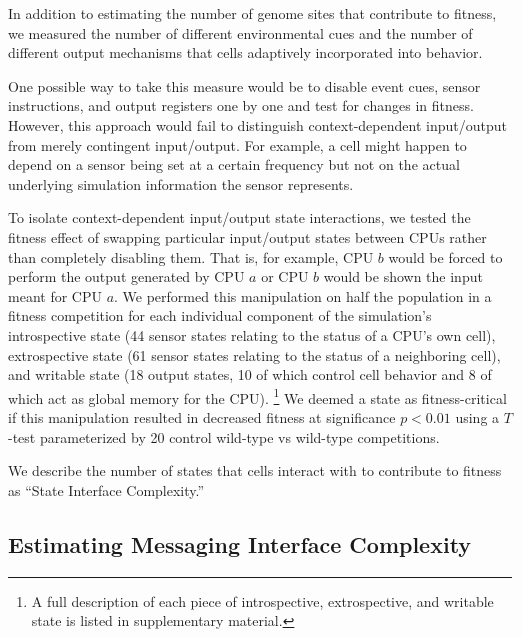 In addition to estimating the number of genome sites that contribute to fitness, we measured the number of different environmental cues and the number of different output mechanisms that cells adaptively incorporated into behavior.

One possible way to take this measure would be to disable event cues, sensor instructions, and output registers one by one and test for changes in fitness.
However, this approach would fail to distinguish context-dependent input/output from merely contingent input/output.
For example, a cell might happen to depend on a sensor being set at a certain frequency but not on the actual underlying simulation information the sensor represents.

To isolate context-dependent input/output state interactions, we tested the fitness effect of swapping particular input/output states between CPUs rather than completely disabling them.
That is, for example, CPU $b$ would be forced to perform the output generated by CPU $a$ or CPU $b$ would be shown the input meant for CPU $a$.
We performed this manipulation on half the population in a fitness competition for each individual component of the simulation's introspective state (44 sensor states relating to the status of a CPU's own cell), extrospective state (61 sensor states relating to the status of a neighboring cell), and writable state (18 output states, 10 of which control cell behavior and 8 of which act as global memory for the CPU).
\footnote{
A full description of each piece of introspective, extrospective, and writable state is listed in supplementary material.
}
We deemed a state as fitness-critical if this manipulation resulted in decreased fitness at significance $p < 0.01$ using a $T$-test parameterized by 20 control wild-type vs wild-type competitions.

We describe the number of states that cells interact with to contribute to fitness as ``State Interface Complexity.''

\subsection{Estimating Messaging Interface Complexity}
\label{sec:estimating-messaging-interface-complexity;ch:measuring-cna}

